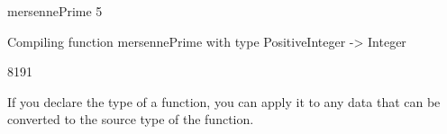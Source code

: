 \begin{xtc}
\begin{xtccomment}
\end{xtccomment}
\begin{spadsrc}
mersennePrime 5 
\end{spadsrc}
\begin{MessageOutput}
   Compiling function mersennePrime with type PositiveInteger -> 
      Integer 
\end{MessageOutput}
\begin{TeXOutput}
\begin{fricasmath}{10}
8191%
\end{fricasmath}
\end{TeXOutput}
\end{xtc}


If you declare the type of a function, you can apply
it to any data that can be converted to the source type
of the function.


